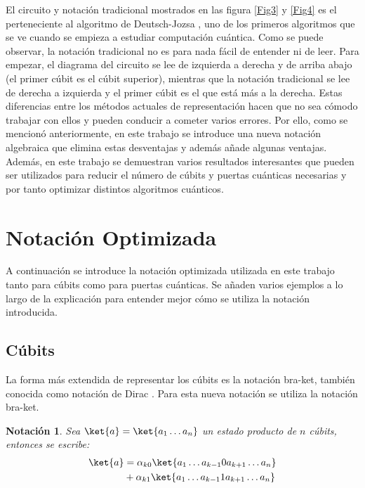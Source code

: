 \documentclass[10pt,conference,a4paper]{IEEEtran}
\newtheorem{notacion}{Notación}[subsection]
\begin{document}
    El circuito y notación tradicional mostrados en las figura \ref{Fig3} y \ref{Fig4} es el perteneciente al algoritmo de Deutsch-Jozsa \cite{Deutsch-Jozsa}, uno de los primeros algoritmos que se ve cuando se empieza a estudiar  computación cuántica. Como se puede observar, la notación tradicional no es para nada fácil de entender ni de leer. Para empezar, el diagrama del circuito se lee de izquierda a derecha y de arriba abajo (el primer cúbit es el cúbit superior), mientras que la notación tradicional se lee de derecha a izquierda y el primer cúbit es el que está más a la derecha. Estas diferencias entre los métodos actuales de representación hacen que no sea cómodo trabajar con ellos y pueden conducir a cometer varios errores. Por ello, como se mencionó anteriormente, en este trabajo se introduce una nueva notación algebraica que elimina estas desventajas y además añade algunas ventajas. Además, en este trabajo se demuestran varios resultados interesantes que pueden ser utilizados para reducir el número de cúbits y puertas cuánticas necesarias y por tanto optimizar distintos algoritmos cuánticos.


    \section{Notación Optimizada}
    \label{seccion:3}
    A continuación se introduce la  notación optimizada  utilizada en este trabajo tanto para cúbits como para puertas cuánticas. Se añaden varios ejemplos a lo largo de la explicación para entender mejor cómo se utiliza  la notación introducida.

    \subsection{Cúbits}
    La forma más extendida de representar los cúbits es la notación bra-ket, también conocida como notación de Dirac \cite{Nielsen_Chuang}. Para esta nueva notación se utiliza la notación bra-ket.
    \begin{notacion}
        Sea $\ket{a}=\ket{a_1\ldots a_n}$ un estado producto de $n$ cúbits, entonces se escribe:
        \begin{align}
            \begin{split}
                \ket{a}&=\alpha_{k0}\ket{a_1\ldots a_{k-1}0a_{k+1}\ldots a_n}\\
                &+\alpha_{k1}\ket{a_1\ldots a_{k-1}1a_{k+1}\ldots a_n}
            \end{split}
        \end{align}
        \label{not:1}
    \end{notacion}
\end{document}
